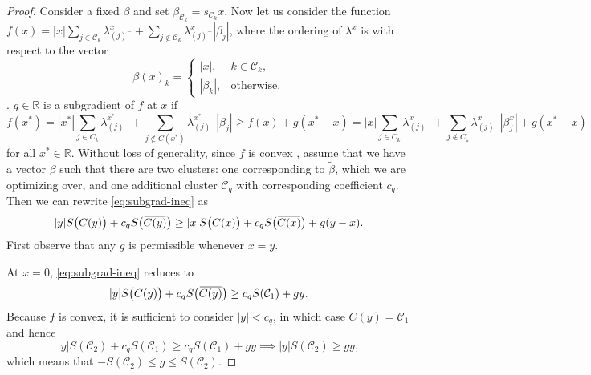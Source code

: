 \begin{proof} 
Consider a fixed $\beta$ and set $\beta_{\mathcal{C}_k}= s_{\mathcal{C}_k}x$.
Now let us consider the function  \(f(x) = |x|\sum_{j \in \mathcal{C}_k}\lambda^x_{(j)^-} + \sum_{j \notin \mathcal{C}_k} \lambda^x_{(j)^-}|\beta_j|\), where the ordering of $\lambda^x$ is with respect to the vector
$$
\beta(x)_k = \begin{cases}
  |x|, & \mbox{$k \in \mathcal{C}_k$}, \\
  |\beta_k|, & \mbox{otherwise}.
\end{cases}
$$
. 
  \(g\in \mathbb{R} \)  is a subgradient of \(f\) at \(x\) if
  \begin{equation}
    \label{eq:subgrad-ineq}
    f(x^*)=|x^*|\sum_{j \in C_k}\lambda^{x^*}_{(j)^-} + \sum_{j \notin C(x^*)}\lambda ^{x^*}_{(j)^-}|\beta_j|
    \geq f(x)+ g(x^* - x)=|x|\sum_{j \in C_k} \lambda^x_{(j)^-} + \sum_{j \notin C_k}\lambda^x_{(j)^-}|\beta^x_j| + g(x^* - x)
  \end{equation}
  for all \(x^* \in \mathbb{R}\).
  Without loss of generality, since \(f\) is convex , assume that we have
  a vector \(\beta\) such that there are two clusters: one corresponding
  to \(\tilde\beta\), which we are optimizing over, and
  one additional cluster \(\mathcal{C}_q\) with corresponding
  coefficient \(c_q\).
  Then we can rewrite \eqref{eq:subgrad-ineq} as
  \[
    |y|S\big(C(y)\big) + c_q S\big(\widebar{C(y)}\big) \geq
    |x| S\big(C(x)\big) + c_q S\big(\widebar{C(x)}\big) + g(y - x).
  \]
  First observe that any \(g\) is permissible whenever \(x = y\).

  At \(x = 0\), \eqref{eq:subgrad-ineq} reduces to
  \[
    |y|S\big(C(y)\big) + c_q S\big(\widebar{C(y)}\big)
    \geq c_q S(\mathcal{C}_1) + gy.
  \]
  Because \(f\) is convex, it is sufficient to consider \(|y| < c_q\),
  in which case \(C(y) = \mathcal{C}_1\) and hence
  \begin{equation}
      |y|S(\mathcal{C}_2) + c_q S(\mathcal{C}_1) \geq c_q S(\mathcal{C}_1) + gy \implies
      |y|S(\mathcal{C}_2) \geq gy,
  \end{equation}
  which means that \(-S(\mathcal{C}_2) \leq g \leq S(\mathcal{C}_2)\).


\end{proof}
